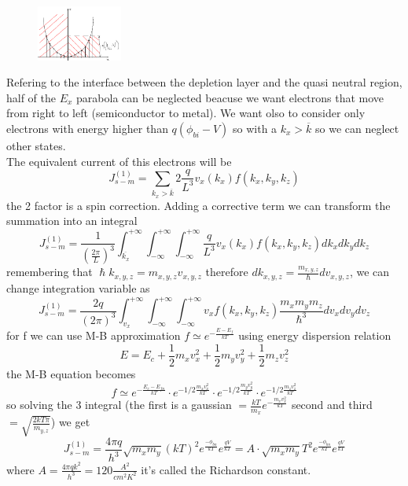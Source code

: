 \begin{figure}
\includegraphics[width=0.25\textwidth]{bethe.png}
\end{figure}

Refering to the interface between the depletion layer and the quasi neutral region, half of the $E_x$ parabola can be neglected beacuse we want electrons that move from right to left (semiconductor to metal). We want olso to consider only electrons with energy higher than $q(\phi_{bi}-V)$ so with a $k_x>\overline{k}$ so we can neglect other states.\\
The equivalent current of this electrons will be 
\begin{equation}
J_{s-m}^{(1)}=\sum_{k_x>\overline{k}}2 \frac{q}{L^3}v_x(k_x)f(k_x,k_y,k_z)
\end{equation}
the 2 factor is a spin correction. Adding a corrective term we can transform the summation into an integral 
\begin{equation}
J_{s-m}^{(1)}=\frac{1}{(\frac{2\pi}{L})^3}\int_{\overline{k_x}}^{+\infty}\int_{-\infty}^{+\infty}\int_{-\infty}^{+\infty}\frac{q}{L^3}v_x(k_x)f(k_x,k_y,k_z)dk_xdk_ydk_z
\end{equation}
remembering that $\hslash k_{x,y,z}=m_{x,y,z}v_{x,y,z}$ therefore $dk_{x,y,z}=\frac{m_{x,y,z}}{\hslash}dv_{x,y,z}$, we can change integration variable as 
\begin{equation}
J_{s-m}^{(1)}=\frac{2q}{(2\pi)^3}\int^{+\infty}_{v_x}\int_{-\infty}^{+\infty}\int_{-\infty}^{+\infty}v_xf(k_x,k_y,k_z) \frac{m_xm_ym_z}{\hslash^3} dv_xdv_ydv_z
\end{equation}
for f we can use M-B approximation $f\simeq e^{-\frac{E-E_f}{kT}}$ using energy dispersion relation 
\begin{equation}
E=E_c+\frac{1}{2}m_xv_x^2+\frac{1}{2}m_yv_y^2+\frac{1}{2}m_zv_z^2
\end{equation}
the M-B equation becomes
\begin{equation}
f\simeq e^{-\frac{E_c-E_{fn}}{kT}}\cdot e^{-1/2\frac{m_xv_x^2}{kT}}\cdot e^{-1/2\frac{m_yv_y^2}{kT}}\cdot e^{-1/2\frac{m_zv_z^2}{kT}}
\end{equation}
so solving the 3 integral (the first is a gaussian $=\frac{kT}{m_x}e^{-\frac{m_xv_x^2}{kT}}$ second and third $=\sqrt{\frac{2kT\pi}{m_{y,z}}}$) we get 
\begin{equation}
J_{s-m}^{(1)}=\frac{4\pi q}{h^3}\sqrt{m_xm_y}(kT)^2e^{\frac{-\phi_{bn}}{kT}}e^{\frac{qV}{kT}}=A\cdot\sqrt{m_xm_y}T^2e^{\frac{-\phi_{bn}}{kT}}e^{\frac{qV}{kT}}
\end{equation}
where $A=\frac{4\pi qk^2}{h^3}=120 \frac{A^2}{cm^2 K^2}$ it's called the Richardson constant.\\

